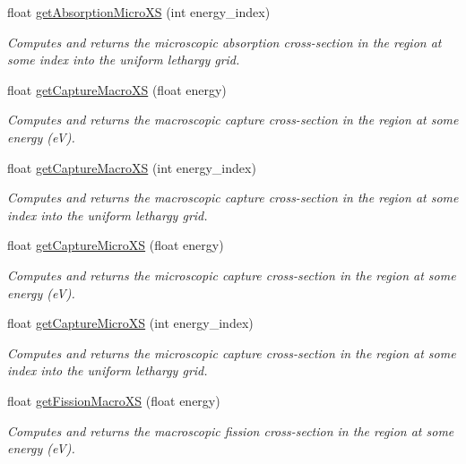 \begin{DoxyCompactItemize}
float \hyperlink{classRegion_aa040e637f1ff6819547c0e4c0a74c4ff}{get\-Absorption\-Micro\-X\-S} (int energy\-\_\-index)
\begin{DoxyCompactList}\small\item\em Computes and returns the microscopic absorption cross-\/section in the region at some index into the uniform lethargy grid. \end{DoxyCompactList}\item 
float \hyperlink{classRegion_a1bb6d0746ee525b5c456bd3b4d5c4cd2}{get\-Capture\-Macro\-X\-S} (float energy)
\begin{DoxyCompactList}\small\item\em Computes and returns the macroscopic capture cross-\/section in the region at some energy (e\-V). \end{DoxyCompactList}\item 
float \hyperlink{classRegion_a646683114e40ca729efbf8e0a80eb615}{get\-Capture\-Macro\-X\-S} (int energy\-\_\-index)
\begin{DoxyCompactList}\small\item\em Computes and returns the macroscopic capture cross-\/section in the region at some index into the uniform lethargy grid. \end{DoxyCompactList}\item 
float \hyperlink{classRegion_ac84f7469d2f314f696d51efd9f661351}{get\-Capture\-Micro\-X\-S} (float energy)
\begin{DoxyCompactList}\small\item\em Computes and returns the microscopic capture cross-\/section in the region at some energy (e\-V). \end{DoxyCompactList}\item 
float \hyperlink{classRegion_aed259d162d731367523beecc8bd85029}{get\-Capture\-Micro\-X\-S} (int energy\-\_\-index)
\begin{DoxyCompactList}\small\item\em Computes and returns the microscopic capture cross-\/section in the region at some index into the uniform lethargy grid. \end{DoxyCompactList}\item 
float \hyperlink{classRegion_a3bbfdb7b952c065e8c940e1d42df6884}{get\-Fission\-Macro\-X\-S} (float energy)
\begin{DoxyCompactList}\small\item\em Computes and returns the macroscopic fission cross-\/section in the region at some energy (e\-V). \end{DoxyCompactList}\item 

\end{DoxyCompactItemize}
